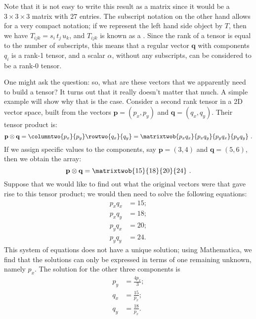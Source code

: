 Note that it is not easy to write this result as a matrix since it would be a $3\times 3\times 3$ matrix with $27$ entries. The subscript notation on the other hand allows for a very compact notation; if we represent the left hand side object by $T$, then we have $T_{ijk}=s_i\,t_j\,u_k$, and $T_{ijk}$ is known as a .  Since the rank of a tensor is equal to the number of subscripts, this means that a regular vector $\mathbf{q}$ with components $q_i$ is a rank-1 tensor, and a scalar $\alpha$, without any subscripts, can be considered to be a rank-0 tensor.

One might ask the question: so, what are these vectors that we apparently need to build a tensor?  It turns out that it really doesn't matter that much. A simple example will show why that is the case. Consider a second rank tensor in a 2D vector space, built from the vectors $\mathbf{p}=(p_x,p_y)$ and $\mathbf{q}=(q_x,q_y)$.  Their tensor product is:
\begin{equation}
	\mathbf{p}\otimes\mathbf{q} = \columntwo{p_x}{p_y}\rowtwo{q_x}{q_y}=\matrixtwob{p_xq_x}{p_xq_y}{p_yq_x}{p_yq_y}\ .
\end{equation}
If we assign specific values to the components, say $\mathbf{p}=(3,4)$ and $\mathbf{q}=(5,6)$, then we obtain the array:
\begin{equation}
	\mathbf{p}\otimes\mathbf{q} = \matrixtwob{15}{18}{20}{24}\ .
\end{equation}
Suppose that we would like to find out what the original vectors were that gave rise to this tensor product; we would then need to solve the following equations:
\begin{equation}
	\begin{split}
		p_xq_x &= 15;\\
		p_xq_y &= 18;\\
		p_yq_x &= 20;\\
		p_yq_y &= 24.
	\end{split}
\end{equation}
This system of equations does not have a unique solution; using Mathematica, we find that the solutions can only be expressed in terms of one remaining unknown, namely $p_x$. The solution for the other three components is
\begin{equation}
	\begin{split}
		p_y &= \frac{4 p_x}{3};\\
		q_x &= \frac{15}{p_x};\\
		q_y &= \frac{18}{p_x}.
	\end{split}
\end{equation}

